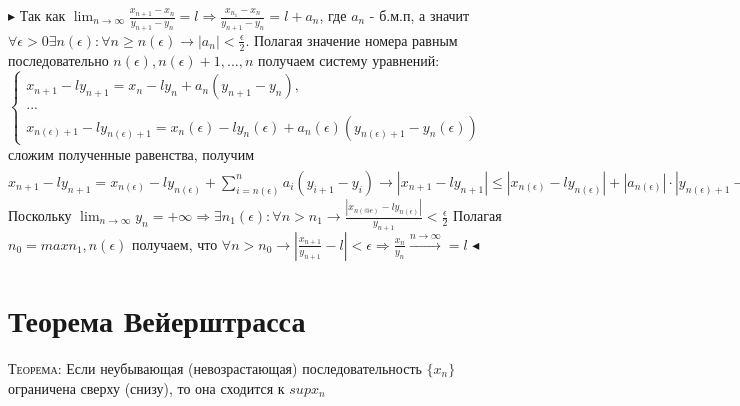 \documentclass[14pt]{article}
\begin{document}
        $\blacktriangleright$ 
        Так как $\lim_{n \rightarrow \infty} \frac{x_{n+1} - x_n}{y_{n+1} - y_n} = l \Rightarrow \frac{x_{n_1} - x_n}{y_{n+1} - y_n} = l + a_n$, где $a_n$ - б.м.п, а значит $\forall \epsilon > 0 \exists n(\epsilon):\forall n \geqslant n(\epsilon) \rightarrow |a_n| < \frac{\epsilon}{2}$. Полагая значение номера равным последовательно $n(\epsilon), n(\epsilon)+1,...,n$ получаем систему уравнений:\\
        $\begin{cases}
            x_{n+1} - ly_{n+1} = x_n - ly_n + a_n (y_{n+1} - y_n), \\ 
            ... \\ 
            x_{n(\epsilon)+1} - ly_{n(\epsilon) + 1} = x_n(\epsilon) - ly_n(\epsilon) + a_n(\epsilon)(y_{n(\epsilon)+1} - y_n(\epsilon))
        \end{cases}$ \\ 
        сложим полученные равенства, получим $x_{n+1} - ly_{n+1} = x_{n(\epsilon)} - ly_{n(\epsilon)} + \sum^n_{i=n(\epsilon)} a_i (y_{i+1}- y_i) \rightarrow  |x_{n+1} - ly_{n+1}| \leqslant |x_{n(\epsilon)} - ly_{n(\epsilon)} | + |a_{n(\epsilon)}| \cdot |y_{n(\epsilon)+1} - y_{n(\epsilon)}| + ... + |a_n| \cdot |y_{n+1} - y_n|, |x_{n+1} - ly_{n+1}| \leqslant |x_{n(\epsilon)} - ly_{n(\epsilon)}| + \frac{\epsilon}{2}|y_{n(\epsilon)+1} - y_{n(\epsilon)}| + ... + \frac{\epsilon}{2}|y_{n+1} - y_n|, |\frac{x_{n+1}}{y_{n+1}} - l| < \frac{|x_{n(\epsilon)} - ly_{n(\epsilon)}|}{y_{n+1}} + \frac{\epsilon}{2}\frac{y_{n+1}- y_{n(\epsilon)}}{y_{n+1}}$
        Поскольку $\lim_{n \rightarrow \infty} y_n = + \infty \Rightarrow \exists n_1(\epsilon):\forall n > n_1 \rightarrow \frac{|x_{n(@e)}-ly_{n(\epsilon)}|}{y_{n+1}} < \frac{\epsilon}{2}$ Полагая $n_0 = max n_1,n(\epsilon) $ получаем, что $\forall n > n_0 \rightarrow |\frac{x_{n+1}}{y_{n+1}} - l| < \epsilon \Rightarrow \frac{x_n}{y_n} \xrightarrow{n \rightarrow \infty} = l$ 
        $\blacktriangleleft$\\


    \section{Теорема Вейерштрасса}
        \textsc{Теорема:} Если неубывающая (невозрастающая) последовательность $\{x_n\}$ ограничена сверху (снизу), то она сходится к $sup x_n$
\end{document}
